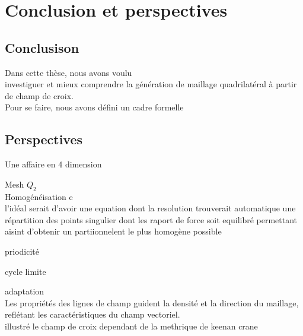 \chapter{Conclusion et perspectives}
\label{chap:conclusion}

\section*{Conclusison}

Dans cette thèse, nous avons voulu\\
investiguer et mieux comprendre la génération de maillage quadrilatéral à partir de champ de croix.\\
Pour se faire, nous avons défini un cadre formelle



\section*{Perspectives}

Une affaire en 4 dimension

Mesh $Q_2$\\
\[\]
Homogénéisation e\\
l'idéal serait d'avoir une equation dont la resolution trouverait automatique une répartition des points singulier dont les raport de force soit equilibré permettant aisint d'obtenir un partiionnelent le plus homogène possible
\[\]

priodicité

cycle limite\\
\[\]

adaptation\\
       Les propriétés des lignes de champ guident la densité et la direction du maillage, reflétant les caractéristiques du champ vectoriel.\\
       illustré le champ de croix dependant de la methrique de keenan crane
\[\]
